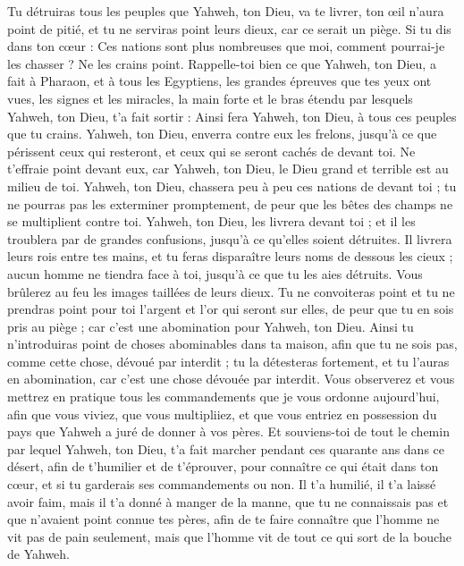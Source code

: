 \begin{multicols}{2}
Tu détruiras tous les peuples que Yahweh, ton Dieu, va te livrer, ton œil n’aura point de pitié, et tu ne serviras point leurs dieux, car ce serait un piège.
Si tu dis dans ton cœur : Ces nations sont plus nombreuses que moi, comment pourrai-je les chasser ?
Ne les crains point. Rappelle-toi bien ce que Yahweh, ton Dieu, a fait à Pharaon, et à tous les Egyptiens,
les grandes épreuves que tes yeux ont vues, les signes et les miracles, la main forte et le bras étendu par lesquels Yahweh, ton Dieu, t'a fait sortir : Ainsi fera Yahweh, ton Dieu, à tous ces peuples que tu crains.
Yahweh, ton Dieu, enverra contre eux les frelons, jusqu'à ce que périssent ceux qui resteront, et ceux qui se seront cachés de devant toi.
Ne t'effraie point devant eux, car Yahweh, ton Dieu, le Dieu grand et terrible est au milieu de toi.
Yahweh, ton Dieu, chassera peu à peu ces nations de devant toi ; tu ne pourras pas les exterminer promptement, de peur que les bêtes des champs ne se multiplient contre toi.
Yahweh, ton Dieu, les livrera devant toi ; et il les troublera par de grandes confusions, jusqu'à ce qu'elles soient détruites.
Il livrera leurs rois entre tes mains, et tu feras disparaître leurs noms de dessous les cieux ; aucun homme ne tiendra face à toi, jusqu'à ce que tu les aies détruits.
Vous brûlerez au feu les images taillées de leurs dieux. Tu ne convoiteras point et tu ne prendras point pour toi l'argent et l'or qui seront sur elles, de peur que tu en sois pris au piège ; car c'est une abomination pour Yahweh, ton Dieu.
Ainsi tu n'introduiras point de choses abominables dans ta maison, afin que tu ne sois pas, comme cette chose, dévoué par interdit ; tu la détesteras fortement, et tu l’auras en abomination, car c'est une chose dévouée par interdit.
\VerseOne{}Vous observerez et vous mettrez en pratique tous les commandements que je vous ordonne aujourd'hui, afin que vous viviez, que vous multipliiez, et que vous entriez en possession du pays que Yahweh a juré de donner à vos pères.
Et souviens-toi de tout le chemin par lequel Yahweh, ton Dieu, t'a fait marcher pendant ces quarante ans dans ce désert, afin de t'humilier et de t'éprouver, pour connaître ce qui était dans ton cœur, et si tu garderais ses commandements ou non.
Il t'a humilié, il t'a laissé avoir faim, mais il t'a donné à manger de la manne, que tu ne connaissais pas et que n’avaient point connue tes pères, afin de te faire connaître que l'homme ne vit pas de pain seulement, mais que l'homme vit de tout ce qui sort de la bouche de Yahweh.

\end{multicols}
